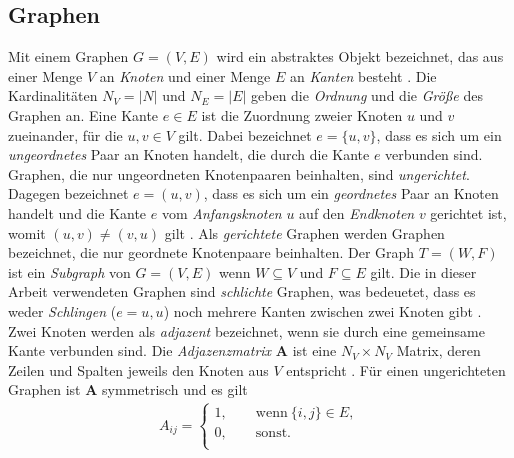 \documentclass[12pt, a4paper]{report}
\begin{document}
\subsection{Graphen}
Mit einem Graphen $G=(V,E)$ wird ein abstraktes Objekt bezeichnet, das aus einer Menge $V$ an \textit{Knoten} und einer Menge $E$ an \textit{Kanten} besteht \cite{brandes2005graphfunda}. Die Kardinalitäten $N_V =|N|$ und $N_E=|E|$ geben die \textit{Ordnung} und die \textit{Größe} des Graphen an. Eine Kante $e \in E$ ist die Zuordnung zweier Knoten $u$ und $v$ zueinander, für die $u,v \in V$ gilt. Dabei bezeichnet $e=\{u,v\}$, dass es sich um ein \textit{ungeordnetes} Paar an Knoten handelt, die durch die Kante $e$ verbunden sind. Graphen, die nur ungeordneten Knotenpaaren beinhalten, sind \textit{ungerichtet}. Dagegen bezeichnet $e=(u,v)$, dass es sich um ein \textit{geordnetes} Paar an Knoten handelt und die Kante $e$ vom \textit{Anfangsknoten} $u$ auf den \textit{Endknoten} $v$ gerichtet ist, womit $(u,v) \neq (v, u)$ gilt \cite{kolaczyk2009statistical}. Als \textit{gerichtete} Graphen werden Graphen bezeichnet, die nur geordnete Knotenpaare beinhalten. Der Graph $T=(W,F)$ ist ein \textit{Subgraph} von $G=(V,E)$ wenn $W \subseteq V$ und $F \subseteq E$ gilt. Die in dieser Arbeit verwendeten Graphen sind \textit{schlichte} Graphen, was bedeuetet, dass es weder \textit{Schlingen} ($e={u,u}$) noch mehrere Kanten zwischen zwei Knoten gibt \cite{tittmann2011graphen}.\\
Zwei Knoten werden als \textit{adjazent} bezeichnet, wenn sie durch eine gemeinsame Kante verbunden sind. Die \textit{Adjazenzmatrix} $\textbf{A}$ ist eine $N_V \times N_V $ Matrix, deren Zeilen und Spalten jeweils den Knoten aus $V$ entspricht \cite{kolaczyk2009statistical}. Für einen ungerichteten Graphen ist $\textbf{A}$ symmetrisch und es gilt 
\begin{align*}
A_{ij} = \begin{cases}
1, \qquad \text{wenn} \ \{i,j\} \in E,\\
0, \qquad \text{sonst.}\\
\end{cases}
\end{align*}




\end{document}

